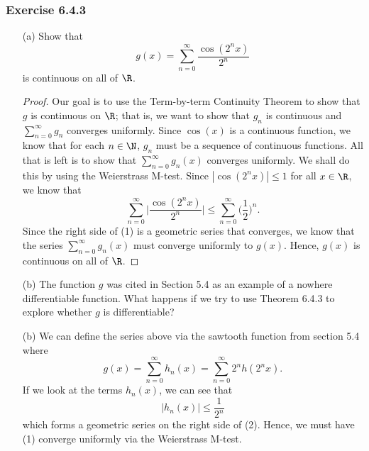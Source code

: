 \subsubsection{Exercise 6.4.3} 
\begin{enumerate}
    \item[(a)] Show that 
        \[  g(x) = \sum_{ n=0 }^{ \infty  } \frac{ \cos(2^n x) }{ 2^n }  \]
        is continuous on all of \( \R  \).
        \begin{proof}
            Our goal is to use the Term-by-term Continuity Theorem to show that \( g  \) is continuous on \( \R  \); that is, we want to show that \( g_n  \) is continuous and \( \sum_{ n=0 }^{ \infty  }  g_n  \) converges uniformly. Since \( \cos(x)  \) is a continuous function, we know that for each \( n \in \N  \), \( g_n  \) must be a sequence of continuous functions. All that is left is to show that \( \sum_{ n=0 }^{ \infty  } g_n(x)  \) converges uniformly. We shall do this by using the Weierstrass M-test. Since \( | \cos(2^n x ) | \leq 1  \) for all \( x \in \R  \), we know that \[  \sum_{ n=0 }^{ \infty  } \Big| \frac{ \cos(2^n x ) }{  2^n  }  \Big|  \leq \sum_{ n=0  }^{ \infty  } \Big( \frac{ 1 }{ 2 }  \Big)^n \tag{1}.  \]
            Since the right side of (1) is a geometric series that converges, we know that the series \( \sum_{ n=0 }^{ \infty  } g_n(x)  \) must converge uniformly to \( g(x)  \). Hence, \( g(x) \) is continuous on all of \( \R  \).
        \end{proof}
    \item[(b)] The function \( g  \) was cited in Section 5.4 as an example of a nowhere differentiable function. What happens if we try to use Theorem 6.4.3 to explore whether \( g  \) is differentiable?
    \item[(b)] We can define the series above via the sawtooth function from section 5.4 where 
        \[  g(x) = \sum_{ n=0 }^{  \infty  } h_n(x) = \sum_{ n=0  }^{  \infty  } 2^n h(2^n x ) \tag{1}.\]
        If we look at the terms \( h_n(x)  \), we can see that 
        \[ | h_n(x)  |  \leq \frac{ 1 }{ 2^n  } \tag{2} \] which forms a geometric series on the right side of (2). Hence, we must have (1) converge uniformly via the Weierstrass M-test.
\end{enumerate}

